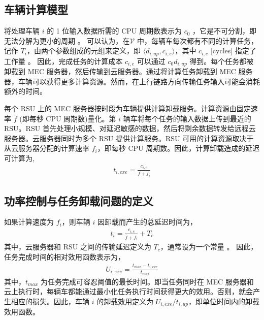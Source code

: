 \subsection{车辆计算模型}\label{section3-2-2}
将处理车辆 $i$ 的 1 位输入数据所需的 CPU 周期数表示为 $c_0$ ，它是不可分割，即无法分解为更小的周期 \supercite{Zhang2017,Saleem2021}。
可以认为，在$ \mathcal{V}$ 中，每辆车每次都有不同的计算任务，记作 $T_i$，由两个参数组成的元组来定义，即 $\langle d_{i,up}, c_{i,e}\rangle$，其中 $c_{i,e}$ [cycles] 指定了工作量 \supercite{Tran2019}。 因此，完成任务的计算成本 $c_{i,e}$ 可以通过 $c_{0}d_{i,up}$ 得到。每个任务都被卸载到 MEC 服务器，然后传输到云服务器。通过将计算任务卸载到 MEC 服务器，车辆可以获得更多计算资源。然而，在上行链路方向传输任务输入可能会消耗额外的时间。

每个 RSU 上的 MEC 服务器按时段为车辆提供计算卸载服务。计算资源由固定速率 $\bar{f}$ (即每秒 CPU 周期数)量化。第 $i$ 辆车将每个任务的输入数据上传到最近的 RSU。RSU 首先处理小规模、对延迟敏感的数据，然后将剩余数据转发给远程云服务器。{云服务器同时为多个 RSU 提供计算服务。RSU 可用的计算资源取决于从云服务器分配的计算速率 $f_i$，}即每秒 CPU 周期数。因此，计算卸载造成的延迟可计算为,
\begin{eqnarray}\label{E3-7}
t_{i,exe}=\frac{c_{i,e}}{\bar{f}+f_i}
\end{eqnarray}
\subsection{功率控制与任务卸载问题的定义}\label{section3-2-3}

如果计算速度为 $f_i$，则车辆 $i$ 因卸载而产生的总延迟时间为，
\begin{eqnarray}\label{E3-8}
 t_i=\frac{c_{i,e}}{\bar{f}+f_i}+T_c
\end{eqnarray}
其中，云服务器和 RSU 之间的传输延迟定义为 $T_c$，通常设为一个常量 \supercite{Xiao2020}。 因此，任务完成时间的相对效用函数表示为，
\begin{eqnarray}\label{E3-9}
U_{i,exe}=\frac{t_{max}-t_{i,exe}}{t_{max}}
\end{eqnarray}
其中，$t_{max}$ 为{任务完成可容忍阈值的最长时间}。即当任务同时在 MEC 服务器和云上执行时，每辆车都能通过最小化任务执行时间获得更大的效用。否则，就会产生相应的损失。因此，车辆 $i$ 的卸载效用定义为
 ${U_{i,exe}}/{t_{i,up}}$，即单位时间内的卸载效用函数。

